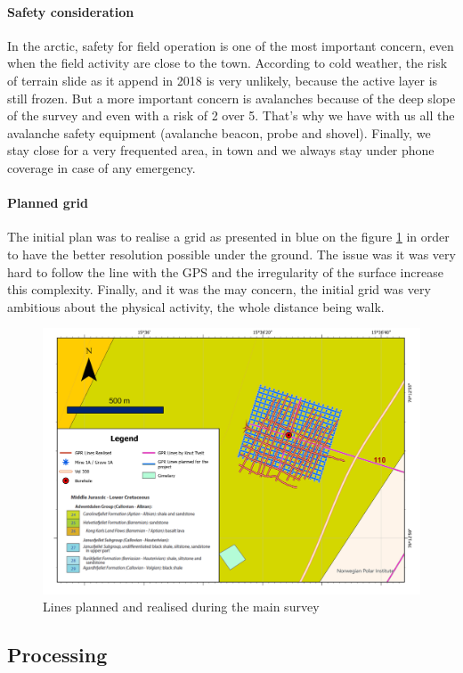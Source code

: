 \paragraph{Safety consideration} In the arctic, safety for field operation is one of the most important concern, even when the field activity are close to the town. According to cold weather, the risk of terrain slide as it append in 2018 is very unlikely, because the active layer is still frozen. But a more important concern is avalanches because of the deep slope of the survey and even with a risk of 2 over 5. That's why we have with us all the avalanche safety equipment (avalanche beacon, probe and shovel).
Finally, we stay close for a very frequented area, in town and we always stay under phone coverage in case of any emergency.

\paragraph{Planned grid}

The initial plan was to realise a grid as presented in blue on the figure \ref{fig:GPRLines} in order to have the better resolution possible under the ground. The issue was it was very hard to follow the line with the GPS and the irregularity of the surface increase this complexity. Finally, and it was the may concern, the initial grid was very ambitious about the physical activity, the whole distance being walk. 

\begin{figure}
    \centering
    \includegraphics[width=\linewidth]{Images/00_Methodology/GPR LIne.jpg}
    \caption{Lines planned and realised during the main survey}
    \label{fig:GPRLines}
\end{figure}

\subsection{Processing}